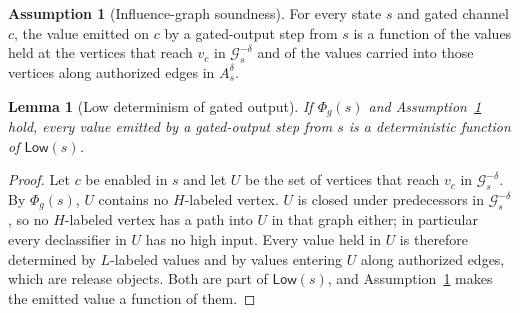 \documentclass[11pt,letterpaper]{article}
\theoremstyle{plain}
\newtheorem{lemma}{Lemma}
\theoremstyle{definition}
\newtheorem{assumption}{Assumption}
\newcommand{\Low}{\mathsf{Low}}
\newcommand{\Gs}{\mathcal{G}}
\begin{document}
\begin{assumption}[Influence-graph soundness]\label{as:sound}
For every state $s$ and gated channel $c$, the value emitted on $c$ by a gated-output step from $s$ is a function of the values held at the vertices that reach $v_c$ in $\Gs^{-\delta}_s$ and of the values carried into those vertices along authorized edges in $A^{\delta}_s$.
\end{assumption}

\begin{lemma}[Low determinism of gated output]\label{lem:lowdet}
If $\Phi_g(s)$ and Assumption~\ref{as:sound} hold, every value emitted by a gated-output step from $s$ is a deterministic function of $\Low(s)$.
\end{lemma}
\begin{proof}
Let $c$ be enabled in $s$ and let $U$ be the set of vertices that reach $v_c$ in $\Gs^{-\delta}_s$. By $\Phi_g(s)$, $U$ contains no $H$-labeled vertex. $U$ is closed under predecessors in $\Gs^{-\delta}_s$, so no $H$-labeled vertex has a path into $U$ in that graph either; in particular every declassifier in $U$ has no high input. Every value held in $U$ is therefore determined by $L$-labeled values and by values entering $U$ along authorized edges, which are release objects. Both are part of $\Low(s)$, and Assumption~\ref{as:sound} makes the emitted value a function of them.
\end{proof}
\end{document}

